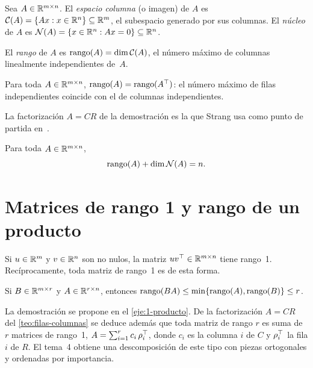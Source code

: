 \begin{definicion}
Sea $A\in\mathbb{R}^{m\times n}$. El \emph{espacio columna} (o imagen) de $A$ es $\mathcal{C}(A)=\{Ax : x\in\mathbb{R}^{n}\}\subseteq\mathbb{R}^{m}$, el subespacio generado por sus columnas. El \emph{núcleo} de $A$ es $\mathcal{N}(A)=\{x\in\mathbb{R}^{n}: Ax=0\}\subseteq\mathbb{R}^{n}$.
\end{definicion}

\begin{definicion}[Rango]
El \emph{rango} de $A$ es $\operatorname{rango}(A)=\dim\mathcal{C}(A)$, el número máximo de columnas linealmente independientes de~$A$.
\end{definicion}

\begin{teorema}\label{teo:filas-columnas}
Para toda $A\in\mathbb{R}^{m\times n}$, $\operatorname{rango}(A)=\operatorname{rango}(A^{\top})$: el número máximo de filas independientes coincide con el de columnas independientes.
\end{teorema}

La factorización $A=CR$ de la demostración es la que Strang usa como punto de partida en~\cite[§1.4]{strang-ila}.

\begin{teorema}\label{teo:rango-nulidad}
Para toda $A\in\mathbb{R}^{m\times n}$,
\[
\operatorname{rango}(A)+\dim\mathcal{N}(A)=n.
\]
\end{teorema}

\addtocounter{definicion}{1}%

\section{Matrices de rango 1 y rango de un producto}

\begin{proposicion}\label{prop:rango1}
Si $u\in\mathbb{R}^{m}$ y $v\in\mathbb{R}^{n}$ son no nulos, la matriz $uv^{\top}\in\mathbb{R}^{m\times n}$ tiene rango~1. Recíprocamente, toda matriz de rango~1 es de esta forma.
\end{proposicion}

\begin{proposicion}\label{prop:rango-producto}
Si $B\in\mathbb{R}^{m\times r}$ y $A\in\mathbb{R}^{r\times n}$, entonces $\operatorname{rango}(BA)\le\min\{\operatorname{rango}(A),\operatorname{rango}(B)\}\le r$.
\end{proposicion}

La demostración se propone en el \cref{eje:1-producto}. De la factorización $A=CR$ del \cref{teo:filas-columnas} se deduce además que toda matriz de rango $r$ es suma de $r$ matrices de rango~1, $A=\sum_{i=1}^{r}c_i\,\rho_i^{\top}$, donde $c_i$ es la columna $i$ de $C$ y $\rho_i^{\top}$ la fila $i$ de $R$. El tema~4 obtiene una descomposición de este tipo con piezas ortogonales y ordenadas por importancia.

